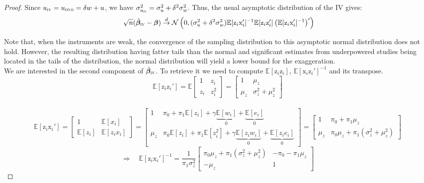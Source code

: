 \documentclass[usletter, 12pt]{article}
\begin{document}
	\begin{proof}
			Since $u_{\textsc{iv}} = u_{\textsc{ovb}} = \delta w + u$, we have $\sigma_{u_{\textsc{iv}}}^2 = \sigma_{u}^{2} + \delta^{2}\sigma_{w}^{2}$. Thus, the usual asymptotic distribution of the IV gives:
				~
				\[ \sqrt{n}(\hat{\bm{\beta}}_{\textsc{iv}} - \bm{\beta}) \overset{d}{\to} 
					\mathcal{N}\left(0,  (\sigma_{u}^{2} + \delta^{2}\sigma_{w}^{2}) \mathbb{E}[\text{z}_{i}\text{x}_{i}']^{-1} \mathbb{E}[\text{z}_{i}\text{z}_{i}'] \left( \mathbb{E}[\text{z}_{i}\text{x}_{i}']^{-1}\right)' \right) \]
			
			Note that, when the instruments are weak, the convergence of the sampling distribution to this asymptotic normal distribution does not hold. However, the resulting distribution having fatter tails than the normal and significant estimates from underpowered studies being located in the tails of the distribution, the normal distribution will yield a lower bound for the exaggeration.\\
			
			We are interested in the second component of $\hat{\bm{\beta}}_{\textsc{iv}}$. To retrieve it we need to compute $\mathbb{E}[\text{z}_{i} \text{z}_{i}]$, $\mathbb{E}[\text{x}_{i}\text{z}_{i}']^{-1}$ and its transpose.  
			~
			\[ 
				\mathbb{E}[\text{z}_{i}\text{z}_i'] 
				= \mathbb{E} \begin{bmatrix}
					1 & z_{i}\\ 
					z_{i} & z_{i}^{2}
				\end{bmatrix} 
				=
				\begin{bmatrix}
					1 & \mu_{z}\\ 
					\mu_{z} & \sigma_{z}^{2} + \mu_{z}^2
				\end{bmatrix} 
				\]
			~
			\[ 
				\mathbb{E}[\text{z}_{i}\text{x}_i'] 
				=
				\begin{bmatrix}
					1 & \mathbb{E}[x_{i}]\\ 
					\mathbb{E}[z_{i}] & \mathbb{E}[z_{i}x_{i}]
				\end{bmatrix} 
				=
				\begin{bmatrix}
					1 & \pi_0 + \pi_1 \mathbb{E}[z_{i}] + \gamma \underbrace{\mathbb{E}[w_{i}]}_{0} + \underbrace{\mathbb{E}[e_{i}]}_{0}\\ 
					\mu_{z} & \pi_0 \mathbb{E}[z_{i}] + \pi_1 \mathbb{E}[z_{i}^{2}] + \gamma \underbrace{\mathbb{E}[z_{i}w_{i}]}_{0} + \underbrace{\mathbb{E}[z_{i}e_{i}]}_{0}
				\end{bmatrix} =
				\begin{bmatrix}
					1 & \pi_0 + \pi_1 \mu_{z}\\ 
					\mu_{z} & \pi_0\mu_z + \pi_1 (\sigma_{z}^{2} + \mu_{z}^{2})
				\end{bmatrix} 
			\]
			\[
				 \Rightarrow \quad
				     \mathbb{E}[\text{z}_{i}\text{x}_i']^{-1} = \dfrac{1}{\pi_1 \sigma_{z}^{2}} 
				     			\begin{bmatrix}
								 \pi_0 \mu_z + \pi_1 (\sigma_{z}^{2} + \mu_{z}^{2})& - \pi_0 - \pi_1 \mu_{z}\\ 
								 -\mu_{z} & 1
							\end{bmatrix} 
			\]
			

\end{proof}
\end{document}
